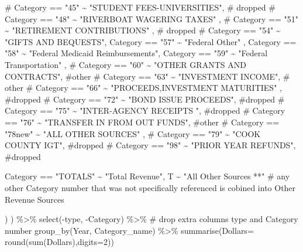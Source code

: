 \documentclass[
  letterpaper,
  DIV=11,
  numbers=noendperiod]{scrreport}
\newenvironment{Shaded}{\begin{snugshade}}{\end{snugshade}}
\newcommand{\AttributeTok}[1]{\textcolor[rgb]{0.40,0.45,0.13}{#1}}
\newcommand{\CommentTok}[1]{\textcolor[rgb]{0.37,0.37,0.37}{#1}}
\newcommand{\DecValTok}[1]{\textcolor[rgb]{0.68,0.00,0.00}{#1}}
\newcommand{\FunctionTok}[1]{\textcolor[rgb]{0.28,0.35,0.67}{#1}}
\newcommand{\NormalTok}[1]{\textcolor[rgb]{0.00,0.23,0.31}{#1}}
\newcommand{\SpecialCharTok}[1]{\textcolor[rgb]{0.37,0.37,0.37}{#1}}
\newcommand{\StringTok}[1]{\textcolor[rgb]{0.13,0.47,0.30}{#1}}
\begin{document}
\begin{Shaded}
\begin{Highlighting}[]
\CommentTok{\#    Category == "45" \textasciitilde{}  "STUDENT FEES{-}UNIVERSITIES",   \# dropped}
\CommentTok{\#    Category == "48" \textasciitilde{}  "RIVERBOAT WAGERING TAXES" ,}
  \CommentTok{\#  Category == "51" \textasciitilde{}  "RETIREMENT CONTRIBUTIONS" , \# dropped}
   \CommentTok{\# Category == "54" \textasciitilde{} "GIFTS AND BEQUESTS", }
\NormalTok{    Category }\SpecialCharTok{==} \StringTok{"57"} \SpecialCharTok{\textasciitilde{}}  \StringTok{"Federal Other"}\NormalTok{ ,}
\NormalTok{    Category }\SpecialCharTok{==} \StringTok{"58"} \SpecialCharTok{\textasciitilde{}}  \StringTok{"Federal Medicaid Reimbursements"}\NormalTok{, }
\NormalTok{    Category }\SpecialCharTok{==} \StringTok{"59"} \SpecialCharTok{\textasciitilde{}}  \StringTok{"Federal Transportation"}\NormalTok{ ,}
 \CommentTok{\#   Category == "60" \textasciitilde{}  "OTHER GRANTS AND CONTRACTS", \#other}
\CommentTok{\#    Category == "63" \textasciitilde{}  "INVESTMENT INCOME", \# other}
 \CommentTok{\#   Category == "66" \textasciitilde{} "PROCEEDS,INVESTMENT MATURITIES" , \#dropped}
 \CommentTok{\#   Category == "72" \textasciitilde{} "BOND ISSUE PROCEEDS",  \#dropped}
 \CommentTok{\#   Category == "75" \textasciitilde{}  "INTER{-}AGENCY RECEIPTS ",  \#dropped}
 \CommentTok{\#   Category == "76" \textasciitilde{}  "TRANSFER IN FROM OUT FUNDS",  \#other}
   \CommentTok{\# Category == "78new" \textasciitilde{}  "ALL OTHER SOURCES" ,}
   \CommentTok{\# Category == "79" \textasciitilde{}   "COOK COUNTY IGT", \#dropped}
 \CommentTok{\#   Category == "98" \textasciitilde{}  "PRIOR YEAR REFUNDS", \#dropped}
                
\NormalTok{Category }\SpecialCharTok{==} \StringTok{"TOTALS"} \SpecialCharTok{\textasciitilde{}} \StringTok{"Total Revenue"}\NormalTok{,}
\NormalTok{T }\SpecialCharTok{\textasciitilde{}} \StringTok{"All Other Sources **"} \CommentTok{\# any other Category number that was not specifically referenced is cobined into Other Revenue Sources}

\NormalTok{  ) ) }\SpecialCharTok{\%\textgreater{}\%} 
  \FunctionTok{select}\NormalTok{(}\SpecialCharTok{{-}}\NormalTok{type, }\SpecialCharTok{{-}}\NormalTok{Category) }\SpecialCharTok{\%\textgreater{}\%}  \CommentTok{\# drop extra columns type and Category number}
  \FunctionTok{group\_by}\NormalTok{(Year, Category\_name) }\SpecialCharTok{\%\textgreater{}\%}
  \FunctionTok{summarise}\NormalTok{(}\AttributeTok{Dollars=} \FunctionTok{round}\NormalTok{(}\FunctionTok{sum}\NormalTok{(Dollars),}\AttributeTok{digits=}\DecValTok{2}\NormalTok{)) }


\end{Highlighting}
\end{Shaded}
\end{document}
